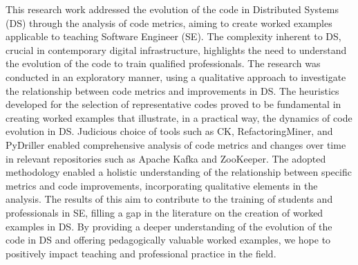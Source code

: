 
\begin{abstractutfpr}%

This research work addressed the evolution of the code in Distributed Systems (DS) through the analysis of code metrics, aiming to create worked examples applicable to teaching Software Engineer (SE). The complexity inherent to DS, crucial in contemporary digital infrastructure, highlights the need to understand the evolution of the code to train qualified professionals. The research was conducted in an exploratory manner, using a qualitative approach to investigate the relationship between code metrics and improvements in DS. The heuristics developed for the selection of representative codes proved to be fundamental in creating worked examples that illustrate, in a practical way, the dynamics of code evolution in DS. Judicious choice of tools such as CK, RefactoringMiner, and PyDriller enabled comprehensive analysis of code metrics and changes over time in relevant repositories such as Apache Kafka and ZooKeeper. The adopted methodology enabled a holistic understanding of the relationship between specific metrics and code improvements, incorporating qualitative elements in the analysis. The results of this aim to contribute to the training of students and professionals in SE, filling a gap in the literature on the creation of worked examples in DS. By providing a deeper understanding of the evolution of the code in DS and offering pedagogically valuable worked examples, we hope to positively impact teaching and professional practice in the field.

\end{abstractutfpr}
